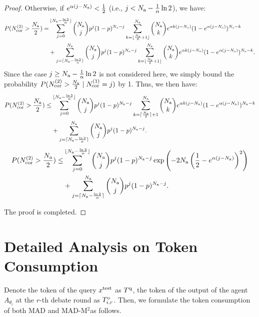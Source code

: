 \documentclass{article} %
\newcommand{\methodname}{MAD-M$^2$}
\newcommand{\uprmvar}[2]{#1^{\rm #2}}
\theoremstyle{plain}
\begin{document}
\begin{proof}
     Otherwise, if $e^{\alpha(j-N_{\rm a})}<\frac{1}{2}$ (i.e., $j<N_{\rm a}-\frac{1}{\alpha}\ln2$), we have:
    \[
    \begin{aligned}
        P(N^{(2)}_{\rm cor}>\frac{N_{\rm a}}{2}) = &\sum_{j=0}^{\lfloor N_{\rm a}-\frac{\ln2}{\alpha}\rfloor}\binom{N_{\rm a}}{j}p^j(1-p)^{N_{\rm a}-j}\sum_{k=\lfloor \frac{N_{\rm a}}{2}+1\rfloor}^{N_{\rm a}}\binom{N_{\rm a}}{k}e^{\alpha k(j-N_{\rm a})}(1-e^{\alpha(j-N_{\rm a})})^{N_{\rm a}-k}\\
        &+\sum_{j=\lceil N_{\rm a}-\frac{\ln2}{\alpha}\rceil}^{N_{\rm a}}\binom{N_{\rm a}}{j}p^j(1-p)^{N_{\rm a}-j}\sum_{k=\lfloor \frac{N_{\rm a}}{2}+1\rfloor}^{N_{\rm a}}\binom{N_{\rm a}}{k}e^{\alpha k(j-N_{\rm a})}(1-e^{\alpha(j-N_{\rm a})})^{N_{\rm a}-k}.
    \end{aligned}
    \]
    Since the case $j\ge N_{\rm a}-\frac{1}{\alpha}\ln 2$ is not considered here, we simply bound the probability $P(N_{\rm cor}^{(2)}>\frac{N_{\rm a}}{2}\mid N_{\rm cor}^{(1)}=j)$ by 1. Thus, we then have: 
    \[
    \begin{aligned}
        P(N^{(2)}_{\rm cor}>\frac{N_{\rm a}}{2}) \leq &\sum_{j=0}^{\lfloor N_{\rm a}-\frac{\ln2}{\alpha}\rfloor}\binom{N_{\rm a}}{j}p^j(1-p)^{N_{\rm a}-j}\sum_{k=\lceil \frac{N_{\rm a}}{2}\rceil+1}^{N_{\rm a}}\binom{N_{\rm a}}{k}e^{\alpha k(j-N_{\rm a})}(1-e^{\alpha(j-N_{\rm a})})^{N_{\rm a}-k}\\&+\sum_{j=\lceil N_{\rm a}-\frac{\ln2}{\alpha}\rceil}^{N_{\rm a}}\binom{N_{\rm a}}{j}p^j(1-p)^{N_{\rm a}-j}.
    \end{aligned}
    \]
    \[
    \begin{aligned}
        P(N^{(2)}_{\rm cor}>\frac{N_{\rm a}}{2}) \leq &\sum_{j=0}^{\lfloor N_{\rm a}-\frac{\ln2}{\alpha}\rfloor}\binom{N_{\rm a}}{j}p^j(1-p)^{N_{\rm a}-j}\exp\left(-2N_{\rm a}\left(\frac{1}{2}-e^{\alpha(j-N_{\rm a})}\right)^2\right)\\&+\sum_{j=\lceil N_{\rm a}-\frac{\ln2}{\alpha}\rceil}^{N_{\rm a}}\binom{N_{\rm a}}{j}p^j(1-p)^{N_{\rm a}-j}.
    \end{aligned}
    \]

    
    The proof is completed.
\end{proof}

\section{Detailed Analysis on Token Consumption}
\label{appendix:token_consumption_analysis}
Denote the token of the query $\uprmvar{x}{test}$ as $\uprmvar{T}{q}$, the token of the output of the agent $A_{\theta_i}$ at the $r$-th debate round as $\uprmvar{T}{o}_{i, r}$. Then, we formulate the token consumption of both MAD and \methodname as follows.
\end{document}
